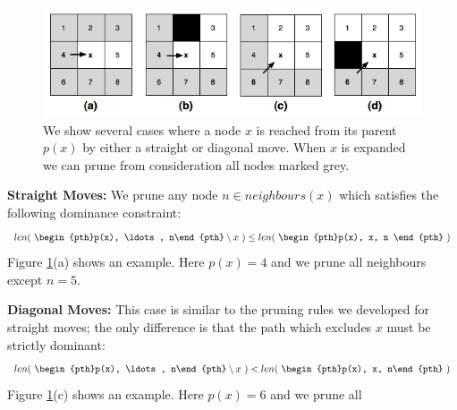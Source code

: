 \begin{figure}[h]
       \begin{center}
		   \includegraphics[scale=0.4, trim = 10mm 10mm 10mm 0mm]
			{diagrams/pruningrules.png}
       \end{center}
	\vspace{-3pt}
       \caption{We show several cases where a node $x$ is reached from its
parent $p(x)$ by either a straight or diagonal move. When $x$ is expanded we can
prune from consideration all nodes marked grey.}
       \label{fig:pruning}
\end{figure}
\par \noindent
\textbf{Straight Moves:} We prune any node $n \in neighbours(x)$ which 
satisfies the following dominance constraint:
\begin{equation}
len(~\begin{pth}p(x), \ldots, n\end{pth} \setminus x~)
\leq len(~\begin{pth}p(x), x, n \end{pth}~)
\end{equation}
Figure \ref{fig:pruning}(a) shows an example. Here $p(x) = 4$ and we prune
 all neighbours except $n = 5$.
\par \noindent
\textbf{Diagonal Moves:} This case is similar to the pruning rules we developed
for straight moves; the only difference is that the path which excludes $x$ must 
be strictly dominant: 
\begin{equation}
len(~\begin{pth}p(x), \ldots, n\end{pth} \setminus x~) < len(~\begin{pth}p(x), x, n\end{pth}~)
\end{equation}
Figure \ref{fig:pruning}(c) shows an example. Here $p(x) = 6$ and we prune all
